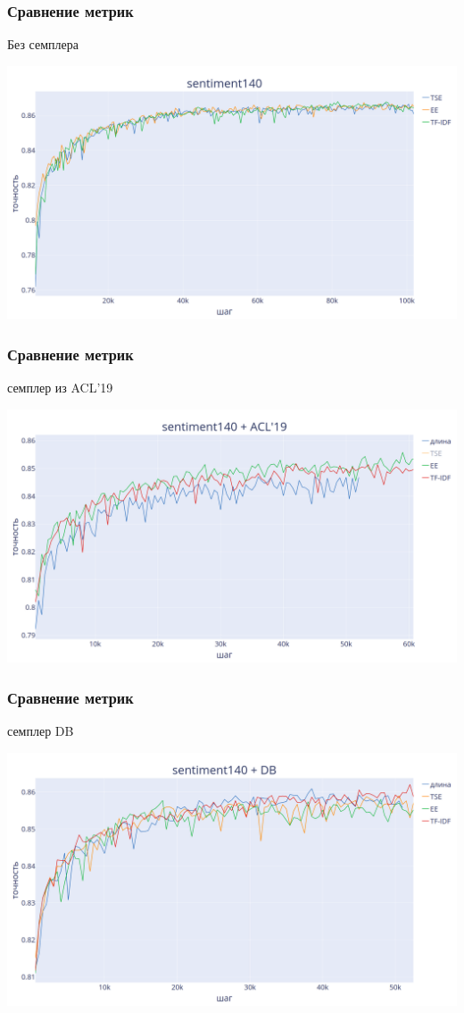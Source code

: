 \documentclass{beamer}
\begin{document}
\begin{frame}
	\frametitle{Сравнение метрик}
	Без семплера
	\begin{center}
		\includegraphics[scale=0.18]{s140_sequential}
	\end{center}
\end{frame}

\begin{frame}
	\frametitle{Сравнение метрик}
	семплер из ACL'19
	\begin{center}
		\includegraphics[scale=0.18]{s140_competence_based}
	\end{center}
\end{frame}

\begin{frame}
	\frametitle{Сравнение метрик}
	семплер DB
	\begin{center}
		\includegraphics[scale=0.18]{s140_difficulty_based}
	\end{center}
\end{frame}
\end{document}
